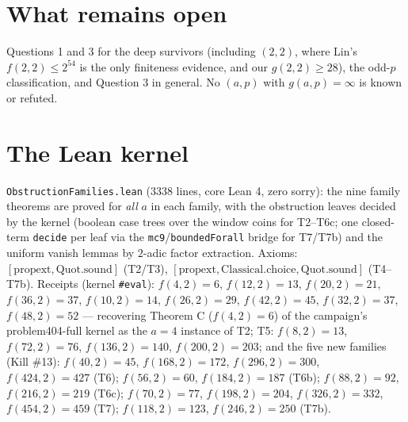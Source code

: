 \documentclass[11pt]{article}
\begin{document}
\section*{What remains open}

Questions 1 and 3 for the deep survivors (including $(2,2)$, where Lin's
$f(2,2) \le 2^{54}$ is the only finiteness evidence, and our $g(2,2) \ge 28$),
the odd-$p$ classification, and Question 3 in general. No $(a,p)$ with
$g(a,p) = \infty$ is known or refuted.

\section*{The Lean kernel}

\texttt{ObstructionFamilies.lean} (3338 lines, core Lean 4, zero sorry):
the nine family theorems are proved for \emph{all} $a$ in each family, with the
obstruction leaves decided by the kernel (boolean case trees over the window
coins for T2--T6c; one closed-term \texttt{decide} per leaf via the
\texttt{mc9}/\texttt{boundedForall} bridge for T7/T7b) and the uniform vanish
lemmas by $2$-adic factor extraction. Axioms:
$[\mathrm{propext}, \mathrm{Quot.sound}]$ (T2/T3),
$[\mathrm{propext}, \mathrm{Classical.choice}, \mathrm{Quot.sound}]$
(T4--T7b). Receipts (kernel \texttt{\#eval}): $f(4,2)=6$, $f(12,2)=13$,
$f(20,2)=21$, $f(36,2)=37$, $f(10,2)=14$, $f(26,2)=29$, $f(42,2)=45$,
$f(32,2)=37$, $f(48,2)=52$ --- recovering Theorem C ($f(4,2)=6$) of the
campaign's problem404-full kernel as the $a=4$ instance of T2; T5:
$f(8,2)=13$, $f(72,2)=76$, $f(136,2)=140$, $f(200,2)=203$; and the five new
families (Kill \#13): $f(40,2)=45$, $f(168,2)=172$, $f(296,2)=300$,
$f(424,2)=427$ (T6); $f(56,2)=60$, $f(184,2)=187$ (T6b); $f(88,2)=92$,
$f(216,2)=219$ (T6c); $f(70,2)=77$, $f(198,2)=204$, $f(326,2)=332$,
$f(454,2)=459$ (T7); $f(118,2)=123$, $f(246,2)=250$ (T7b).
\end{document}
